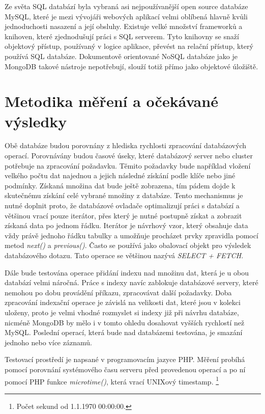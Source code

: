 Ze světa SQL databází byla vybraná asi nejpoužívanější open source databáze MySQL, které je mezi vývojáři webových aplikací velmi oblíbená hlavně kvůli jednoduchosti nasazení a její obsluhy. Existuje velké množství frameworků a knihoven, které zjednodušují práci s SQL serverem. Tyto knihovny se snaží objektový přístup, používaný v logice aplikace, převést na relační přístup, který používá SQL databáze. Dokumentově orientované NoSQL databáze jako je MongoDB takové nástroje nepotřebují, slouží totiž přímo jako objektové úložiště.

\section{Metodika měření a očekávané výsledky}
Obě databáze budou porovnány z hlediska rychlosti zpracování databázových operací. Porovnávány budou časové úseky, které databázový server nebo cluster potřebuje na zpracování požadavku. Těmito požadavky bude například vložení velkého počtu dat najednou a jejich následné získání podle klíče nebo jiné podmínky. Získaná množina dat bude ještě zobrazena, tím pádem dojde k skutečnému získání celé vybrané množiny z databáze. Tento mechanismus je nutné doplnit proto, že databázové ovladače optimalizují práci s databází a většinou vrací pouze iterátor, přes který je nutné postupně získat a zobrazit získaná data po jednom řádku. Iterátor je návrhový vzor, který obsahuje data vždy právě jednoho řádku tabulky a umožňuje procházet prvky zpravidla pomocí metod \emph{next()} a \emph{previous()}. Často se používá jako obalovací objekt pro výsledek databázového dotazu. Tato operace se většinou nazývá \emph{SELECT + FETCH}.

Dále bude testována operace přidání indexu nad množinu dat, která je u obou databází velmi náročná. Práce s indexy navíc zablokuje databázové servery, které nemohou po dobu provádění příkazu, zpracovávat další požadavky. Doba zpracování indexační operace je závislá na velikosti dat, které jsou v kolekci uloženy, proto je velmi vhodné rozmyslet si indexy již při návrhu databáze, nicméně MongoDB by mělo i v tomto ohledu dosahovat vyšších rychlostí než MySQL. Poslední operací, která bude nad databázemi testována, je smazání jednoho nebo více záznamů.

Testovací prostředí je napsané v programovacím jazyce PHP. Měření probíhá pomocí porovnání systémového času serveru před provedenou operací a po ní pomocí PHP funkce \emph{microtime()}, která vrací UNIXový timestamp. \footnote{Počet sekund od 1.1.1970 00:00:00.}

